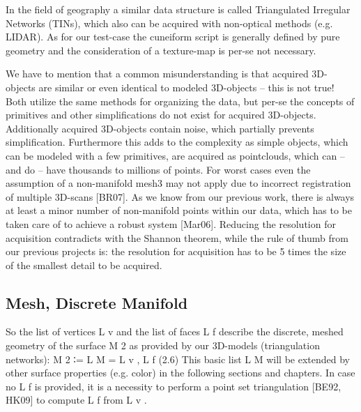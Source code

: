In the field of geography a similar data structure is called
Triangulated Irregular Networks (TINs), which also can be acquired with
non-optical methods (e.g. LIDAR). As for our test-case the cuneiform script is
generally defined by pure geometry and the consideration of a texture-map is
per-se not necessary.~\cite[p.~25]{Mara12}

We have to mention that a common misunderstanding is that acquired 3D-objects are similar or even identical to modeled 3D-objects – this is not true! Both utilize the same methods for organizing the data, but per-se the concepts of primitives and other simplifications do not exist for acquired 3D-objects. Additionally acquired 3D-objects contain noise, which partially prevents simplification. Furthermore this adds to the complexity as simple objects, which can be modeled with a few primitives, are acquired as pointclouds, which can – and do – have thousands to millions of points. For worst cases even the assumption of a non-manifold mesh3 may not apply due to incorrect registration of multiple 3D-scans [BR07]. As we know from our previous work, there is always at least a minor number of non-manifold points within our data, which has to be taken care of to achieve a robust system [Mar06]. Reducing the resolution for acquisition contradicts with the Shannon theorem, while the rule of thumb from our previous projects is: the resolution for acquisition has to be 5 times the size of the smallest detail to be acquired.~\cite[p.~25]{Mara12}
%
\subsection{Mesh, Discrete Manifold}%
So the list of vertices L v and the list of faces L f describe the discrete,
meshed geometry of the surface M 2 as provided by our 3D-models (triangulation
networks): M 2 ∶= L M = {L v , L f } (2.6)
This basic list L M will be extended by other surface properties (e.g. color) in
the following sections and chapters. In case no L f is provided, it is a
necessity to perform a point set triangulation [BE92, HK09] to compute L f from
L v .~\cite[p.~26]{Mara12}%
%

%
